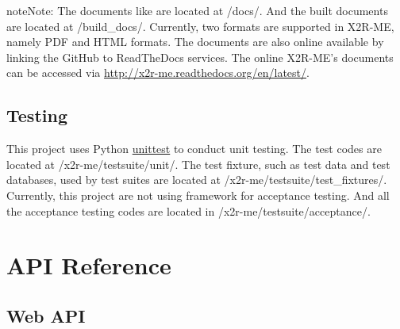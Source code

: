 \documentclass[letterpaper,10pt,english]{sphinxmanual}
\begin{document}
\begin{notice}{note}{Note:}
The documents like  are located at /docs/. And the built documents are located at /build\_docs/.
Currently, two formats are supported in X2R-ME, namely PDF and HTML formats. The documents are also online
available by linking the GitHub to ReadTheDocs services. The online X2R-ME's documents can be accessed via
\href{http://x2r-me.readthedocs.org/en/latest/}{http://x2r-me.readthedocs.org/en/latest/}.
\end{notice}


\section{Testing}
\label{developer_guide:testing}
This project uses Python \href{https://docs.python.org/2/library/unittest.html}{unittest} to conduct unit testing. The test codes are located at /x2r-me/testsuite/unit/. The test fixture, such as test data and test databases, used by test suites are located at /x2r-me/testsuite/test\_fixtures/. Currently, this project are not using framework for acceptance testing. And all the acceptance testing codes are located in /x2r-me/testsuite/acceptance/.


\chapter{API Reference}
\label{index:api-reference}\label{index:unittest}

\section{Web API}
\label{api_ref::doc}\label{api_ref:web-api}
\end{document}
